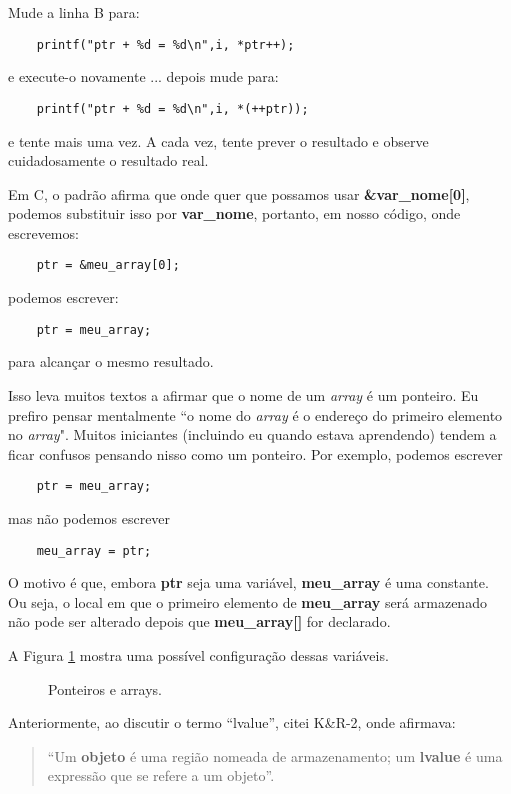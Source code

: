 Mude a linha B para:
\begin{lstlisting}
	printf("ptr + %d = %d\n",i, *ptr++);
\end{lstlisting}
e execute-o novamente ... depois mude para:
\begin{lstlisting}
	printf("ptr + %d = %d\n",i, *(++ptr));
\end{lstlisting}
e tente mais uma vez. A cada vez, tente prever o resultado e observe cuidadosamente o resultado real.

Em C, o padrão afirma que onde quer que possamos usar \textbf{\&var\_nome[0]}, podemos substituir isso por \textbf{var\_nome}, portanto, em nosso código, onde escrevemos:
\begin{lstlisting}
	ptr = &meu_array[0];
\end{lstlisting}
podemos escrever:
\begin{lstlisting}
	ptr = meu_array;
\end{lstlisting}
para alcançar o mesmo resultado.

Isso leva muitos textos a afirmar que o nome de um \textit{array} é um ponteiro. Eu prefiro pensar mentalmente ``o nome do \textit{array} é o endereço do primeiro elemento no \textit{array}". Muitos iniciantes (incluindo eu quando estava aprendendo) tendem a ficar confusos pensando nisso como um ponteiro. Por exemplo, podemos escrever
\begin{lstlisting}
	ptr = meu_array;
\end{lstlisting}
mas não podemos escrever
\begin{lstlisting}
	meu_array = ptr;
\end{lstlisting}

O motivo é que, embora \textbf{ptr} seja uma variável, \textbf{meu\_array} é uma constante. Ou seja, o local em que o primeiro elemento de \textbf{meu\_array} será armazenado não pode ser alterado depois que \textbf{meu\_array[]} for declarado.

A Figura \ref{fig:pontarrays} mostra uma possível configuração dessas variáveis.
\begin{figure}[ht]
	\begin{center}
		
		\caption{Ponteiros e arrays.}
		\label{fig:pontarrays}
	\end{center}
\end{figure}

Anteriormente, ao discutir o termo ``lvalue'', citei K\&R-2, onde afirmava:

\begin{quotation}
	``Um \textbf{objeto} é uma região nomeada de armazenamento; um \textbf{lvalue} é uma expressão que se refere a um objeto''.
\end{quotation}

